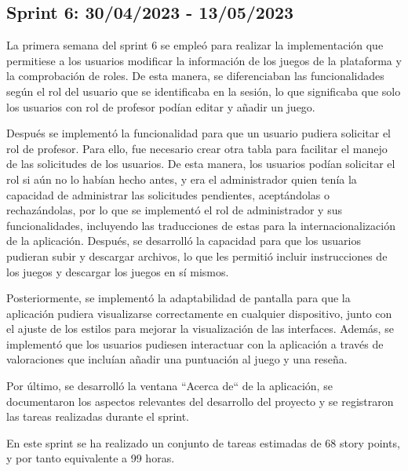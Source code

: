 \subsection{Sprint 6: 30/04/2023 - 13/05/2023}
La primera semana del sprint 6 se empleó para realizar la implementación que permitiese a los usuarios modificar la información de los juegos de la plataforma y la comprobación de roles. De esta manera, se diferenciaban las funcionalidades según el rol del usuario que se identificaba en la sesión, lo que significaba que solo los usuarios con rol de profesor podían editar y añadir un juego.

Después se implementó la funcionalidad para que un usuario pudiera solicitar el rol de profesor. Para ello, fue necesario crear otra tabla para facilitar el manejo de las solicitudes de los usuarios. De esta manera, los usuarios podían solicitar el rol si aún no lo habían hecho antes, y era el administrador quien tenía la capacidad de administrar las solicitudes pendientes, aceptándolas o rechazándolas, por lo que se implementó el rol de administrador y sus funcionalidades, incluyendo las traducciones de estas para la internacionalización de la aplicación.
Después, se desarrolló la capacidad para que los usuarios pudieran subir y descargar archivos, lo que les permitió incluir instrucciones de los juegos y descargar los juegos en sí mismos.

Posteriormente, se implementó la adaptabilidad de pantalla para que la aplicación pudiera visualizarse correctamente en cualquier dispositivo, junto con el ajuste de los estilos para mejorar la visualización de las interfaces. Además, se implementó que los usuarios pudiesen interactuar con la aplicación a través de valoraciones que incluían añadir una puntuación al juego y una reseña.

Por último, se desarrolló la ventana ``Acerca de`` de la aplicación, se documentaron los aspectos relevantes del desarrollo del proyecto y se registraron las tareas realizadas durante el sprint.

En este sprint se ha realizado un conjunto de tareas estimadas de 68 story points, y por tanto equivalente a 99 horas.


